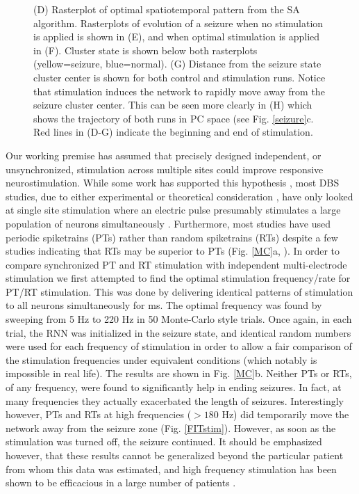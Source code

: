 \documentclass[11pt,a4paper,final]{article}
\begin{document}
\begin{figure}[!ht]
{		(D) Rasterplot of optimal spatiotemporal pattern from the SA algorithm.
		Rasterplots of evolution of a seizure when no stimulation is applied is shown in (E), and when optimal stimulation is applied in (F). Cluster state is shown below both rasterplots (yellow=seizure, blue=normal).
		(G) Distance from the seizure state cluster center is shown for both control and stimulation runs. Notice that stimulation induces the network to rapidly move away from the seizure cluster center. This can be seen more clearly in (H) which shows the trajectory of both runs in PC space (see Fig. \ref{seizure}c.
		Red lines in (D-G) indicate the beginning and end of stimulation.}
	\label{SAresults}
\end{figure}

Our working premise has assumed that precisely designed independent, or unsynchronized, stimulation across multiple sites could improve responsive neurostimulation.
While some work has supported this hypothesis \citep{nelson11}, most DBS studies, due to either experimental or theoretical consideration \citep{durand01}, have only looked at single site stimulation where an electric pulse presumably stimulates a large population of neurons simultaneously \citep{sun14}.
Furthermore, most studies have used periodic spiketrains (PTs) rather than random spiketrains (RTs) despite a few studies indicating that RTs may be superior to PTs (Fig. \ref{MC}a, \citet{wyckhuys10,van14}).
In order to compare synchronized PT and RT stimulation with independent multi-electrode stimulation we first attempted to find the optimal stimulation frequency/rate for PT/RT stimulation.
This was done by delivering identical patterns of stimulation to all \nn{} neurons simultaneously for \len{}ms.
The optimal frequency was found by sweeping from 5 Hz to 220 Hz in 50 Monte-Carlo style trials.
Once again, in each trial, the RNN was initialized in the seizure state, and identical random numbers were used for each frequency of stimulation in order to allow a fair comparison of the stimulation frequencies under equivalent conditions (which notably is impossible in real life).
The results are shown in Fig. \ref{MC}b.
Neither PTs or RTs, of any frequency, were found to significantly help in ending seizures.
In fact, at many frequencies they actually exacerbated the length of seizures.
Interestingly however, PTs and RTs at high frequencies ($>180$ Hz) did temporarily move the network away from the seizure zone (Fig. \ref{FITstim}).
However, as soon as the stimulation was turned off, the seizure continued.
It should be emphasized however, that these results cannot be generalized beyond the particular patient from whom this data was estimated, and high frequency stimulation has been shown to be efficacious in a large number of patients \citep{heck14}.
\end{document}
